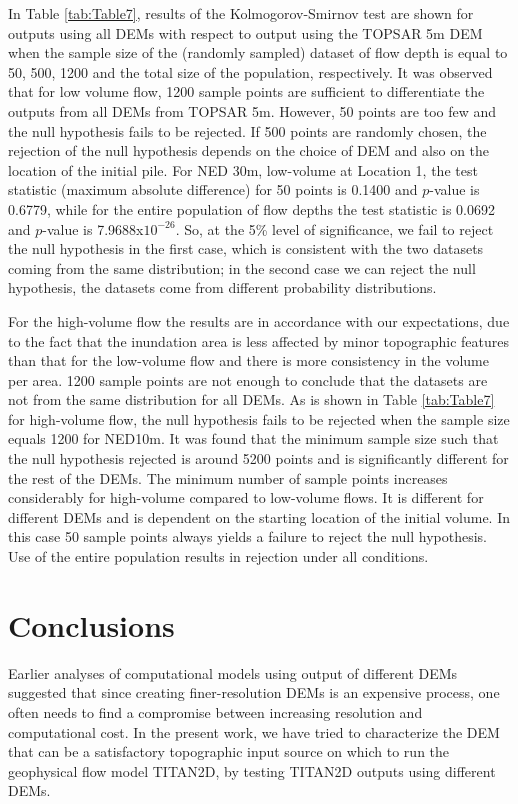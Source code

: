 \documentclass[12pt,letterpaper]{article}
\begin{document}
In Table \ref{tab:Table7}, results of the Kolmogorov-Smirnov test are
shown for outputs using all DEMs with respect to output using the
TOPSAR 5m DEM when the sample size of the (randomly sampled) dataset
of flow depth is equal to 50, 500, 1200 and the total size of the
population, respectively.  It was observed that for low volume flow,
1200 sample points are sufficient to differentiate the outputs from
all DEMs from TOPSAR 5m.  However, 50 points are too few and the null
hypothesis fails to be rejected. If 500 points are randomly chosen,
the rejection of the null hypothesis depends on the choice of DEM and
also on the location of the initial pile.  For NED 30m, low-volume at
Location 1, the test statistic (maximum absolute difference) for 50
points is 0.1400 and $p$-value is 0.6779, while for the entire
population of flow depths the test statistic is 0.0692 and $p$-value
is 7.9688x$10^{-26}$. So, at the 5\% level of significance, we fail to
reject the null hypothesis in the first case, which is consistent with
the two datasets coming from the same distribution; in the second case
we can reject the null hypothesis, the datasets come from different
probability distributions.

For the high-volume flow the results are in accordance with
our expectations, due to the fact that the inundation area is less
affected by minor topographic features than that for the low-volume
flow and there is more consistency in the volume per area. 1200
sample points are not enough to conclude that the datasets are not
from the same distribution for all DEMs.  As is shown in Table
\ref{tab:Table7} for high-volume flow, the null hypothesis fails to be
rejected when the sample size equals 1200 for NED10m. It was found
that the minimum sample size such that the null hypothesis rejected is
around 5200 points and is significantly different for the rest of the
DEMs.  The minimum number of sample points increases considerably for
high-volume compared to low-volume flows.  It is different for
different DEMs and is dependent on the starting location of the
initial volume. In this case 50 sample points always yields a failure
to reject the null hypothesis.  Use of the entire population results
in rejection under all conditions.



\section{Conclusions}\label{conclusions}

Earlier analyses of computational models using output of different
DEMs suggested that since creating finer-resolution DEMs is an
expensive process, one often needs to find a compromise between
increasing resolution and computational cost.  In the present work, we
have tried to characterize the DEM that can be a satisfactory
topographic input source on which to run the geophysical flow model
TITAN2D, by testing TITAN2D outputs using different DEMs.
\end{document}
